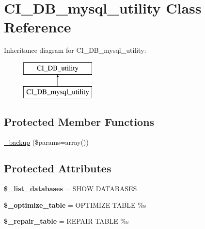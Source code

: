 \hypertarget{class_c_i___d_b__mysql__utility}{}\section{C\+I\+\_\+\+D\+B\+\_\+mysql\+\_\+utility Class Reference}
\label{class_c_i___d_b__mysql__utility}
Inheritance diagram for C\+I\+\_\+\+D\+B\+\_\+mysql\+\_\+utility\+:\begin{figure}[H]
\begin{center}
\leavevmode
\includegraphics[height=2.000000cm]{class_c_i___d_b__mysql__utility}
\end{center}
\end{figure}
\subsection*{Protected Member Functions}
\begin{DoxyCompactItemize}
\item 
\mbox{\hyperlink{class_c_i___d_b__mysql__utility_a31fc59000279e7e4af01bd1ea4de9c5c}{\+\_\+backup}} (\$params=array())
\end{DoxyCompactItemize}
\subsection*{Protected Attributes}
\begin{DoxyCompactItemize}
\item 
\mbox{\label{class_c_i___d_b__mysql__utility_ae51d99f3a4ada3db32f8c9a993c9a669}} 
{\bfseries \$\+\_\+list\+\_\+databases} = \textquotesingle{}S\+H\+OW D\+A\+T\+A\+B\+A\+S\+ES\textquotesingle{}
\item 
\mbox{\label{class_c_i___d_b__mysql__utility_a45d1f5f8821bd9eaa56bed1b05fc107c}} 
{\bfseries \$\+\_\+optimize\+\_\+table} = \textquotesingle{}O\+P\+T\+I\+M\+I\+ZE T\+A\+B\+LE \%s\textquotesingle{}
\item 
\mbox{\label{class_c_i___d_b__mysql__utility_a6cab9f8217c66a4c7fbaf32e3c05b36f}} 
{\bfseries \$\+\_\+repair\+\_\+table} = \textquotesingle{}R\+E\+P\+A\+IR T\+A\+B\+LE \%s\textquotesingle{}
\end{DoxyCompactItemize}
